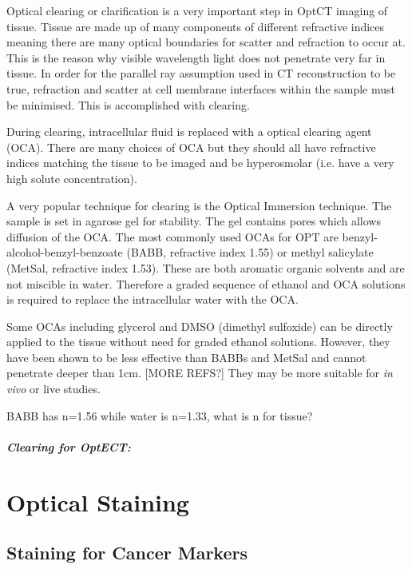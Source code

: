 \documentclass[12pt]{article}
\begin{document}
Optical clearing or clarification is a very important step in OptCT imaging of tissue. Tissue are made up of many components of different refractive indices meaning there are many optical boundaries for scatter and refraction to occur at. This is the reason why visible wavelength light does not penetrate very far in tissue. In order for the parallel ray assumption used in CT reconstruction to be true, refraction and scatter at cell membrane interfaces within the sample must be minimised. \cite{Oldham:2006} This is accomplished with clearing.

During clearing, intracellular  fluid is replaced with a optical clearing agent (OCA). There are many choices of OCA but they should all have refractive indices matching the tissue to be imaged and be hyperosmolar (i.e. have a very high solute concentration).
 
 
A very popular technique for clearing is the Optical Immersion technique. The sample is set in agarose gel for stability. The gel contains pores which allows diffusion of the OCA. The most commonly used OCAs for OPT are benzyl-alcohol-benzyl-benzoate (BABB, refractive index 1.55) or methyl salicylate (MetSal, refractive index 1.53). These are both aromatic organic solvents and are not miscible in water. Therefore a graded sequence of ethanol and OCA solutions is required to replace the intracellular water with the OCA. \cite{Oldham:2006} 

Some OCAs including glycerol and DMSO (dimethyl sulfoxide) can be directly applied to the tissue without need for graded ethanol solutions. However, they have been shown to be less effective than BABBs and MetSal and cannot penetrate deeper than 1cm. \cite{Oldham:2006} [MORE REFS?] They may be more suitable for \textit{in vivo} or live studies.

BABB has n=1.56 while water is n=1.33, what is n for tissue? \cite{Walls:2005ja}


\subparagraph{Clearing for OptECT:}
\cite{Oldham:2008dfa}
\cite{Sakhalkar:2007hp} 





\newpage
\section{Optical Staining}
\subsection{Staining for Cancer Markers}
\end{document}
